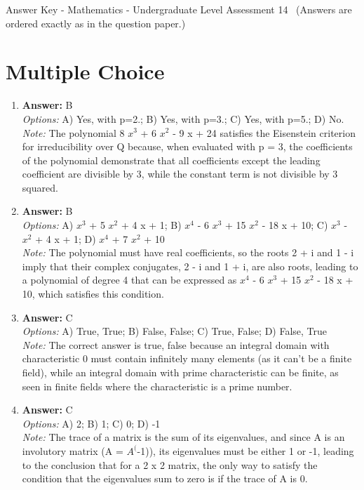 \documentclass[12pt]{article}
\begin{document}
\begin{center}
Answer Key - Mathematics - Undergraduate Level Assessment 14 \
\small (Answers are ordered exactly as in the question paper.)
\end{center}

\section*{Multiple Choice}
\begin{enumerate}[label=\arabic*.]
\item \textbf{Answer:} B
\\ \textit{Options:} A) Yes, with p=2.; B) Yes, with p=3.; C) Yes, with p=5.; D) No.
\\ \textit{Note:} The polynomial 8 $x^3$ + 6 $x^2$ - 9 x + 24 satisfies the Eisenstein criterion for irreducibility over Q because, when evaluated with p = 3, the coefficients of the polynomial demonstrate that all coefficients except the leading coefficient are divisible by 3, while the constant term is not divisible by 3 squared.
\item \textbf{Answer:} B
\\ \textit{Options:} A) $x^3$ + 5 $x^2$ + 4 x + 1; B) $x^4$ - 6 $x^3$ + 15 $x^2$ - 18 x + 10; C) $x^3$ - $x^2$ + 4 x + 1; D) $x^4$ + 7 $x^2$ + 10
\\ \textit{Note:} The polynomial must have real coefficients, so the roots 2 + i and 1 - i imply that their complex conjugates, 2 - i and 1 + i, are also roots, leading to a polynomial of degree 4 that can be expressed as $x^4$ - 6 $x^3$ + 15 $x^2$ - 18 x + 10, which satisfies this condition.
\item \textbf{Answer:} C
\\ \textit{Options:} A) True, True; B) False, False; C) True, False; D) False, True
\\ \textit{Note:} The correct answer is true, false because an integral domain with characteristic 0 must contain infinitely many elements (as it can't be a finite field), while an integral domain with prime characteristic can be finite, as seen in finite fields where the characteristic is a prime number.
\item \textbf{Answer:} C
\\ \textit{Options:} A) 2; B) 1; C) 0; D) -1
\\ \textit{Note:} The trace of a matrix is the sum of its eigenvalues, and since A is an involutory matrix (A = $A^($-1)), its eigenvalues must be either 1 or -1, leading to the conclusion that for a 2 x 2 matrix, the only way to satisfy the condition that the eigenvalues sum to zero is if the trace of A is 0.

\end{enumerate}
\end{document}
